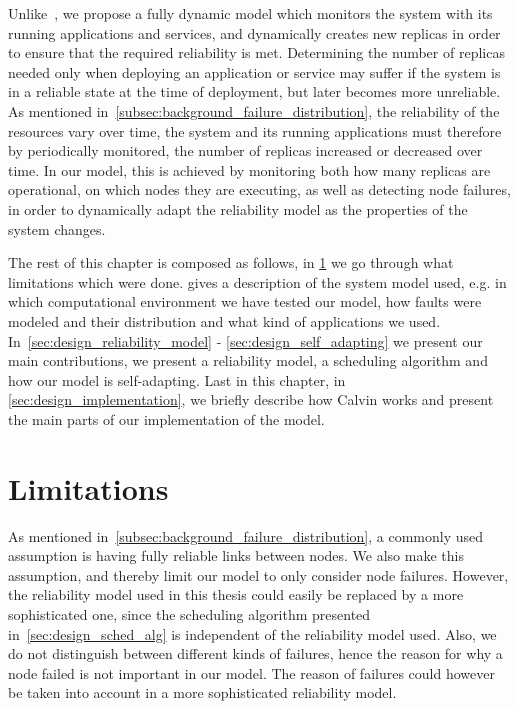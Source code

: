 \documentclass{cslthse-msc}
\begin{document}
Unlike~\cite{designFaultTolerantSched, evalReplicationSched, taskSchedulingReplication, effTaskReplMobGrid, relGridServicePredConstraint}, we propose a fully dynamic model which monitors the system with its running applications and services, and dynamically creates new replicas in order to ensure that the required reliability is met. Determining the number of replicas needed only when deploying an application or service may suffer if the system is in a reliable state at the time of deployment, but later becomes more unreliable. As mentioned in~\cref{subsec:background_failure_distribution}, the reliability of the resources vary over time, the system and its running applications must therefore by periodically monitored, the number of replicas increased or decreased over time. In our model, this is achieved by monitoring both how many replicas are operational, on which nodes they are executing, as well as detecting node failures, in order to dynamically adapt the reliability model as the properties of the system changes.

The rest of this chapter is composed as follows, in \cref{sec:design_limitations} we go through what limitations which were done.  gives a description of the system model used, e.g. in which computational environment we have tested our model, how faults were modeled and their distribution and what kind of applications we used. In~\cref{sec:design_reliability_model} - \cref{sec:design_self_adapting} we present our main contributions, we present a reliability model, a scheduling algorithm and how our model is self-adapting. Last in this chapter, in \cref{sec:design_implementation}, we briefly describe how Calvin works and present the main parts of our implementation of the model.

\section{Limitations} \label{sec:design_limitations}
As mentioned in~\cref{subsec:background_failure_distribution}, a commonly used assumption is having fully reliable links between nodes. We also make this assumption, and thereby limit our model to only consider node failures. However, the reliability model used in this thesis could easily be replaced by a more sophisticated one, since the scheduling algorithm presented in~\cref{sec:design_sched_alg} is independent of the reliability model used. Also, we do not distinguish between different kinds of failures, hence the reason for why a node failed is not important in our model. The reason of failures could however be taken into account in a more sophisticated reliability model.
\end{document}
